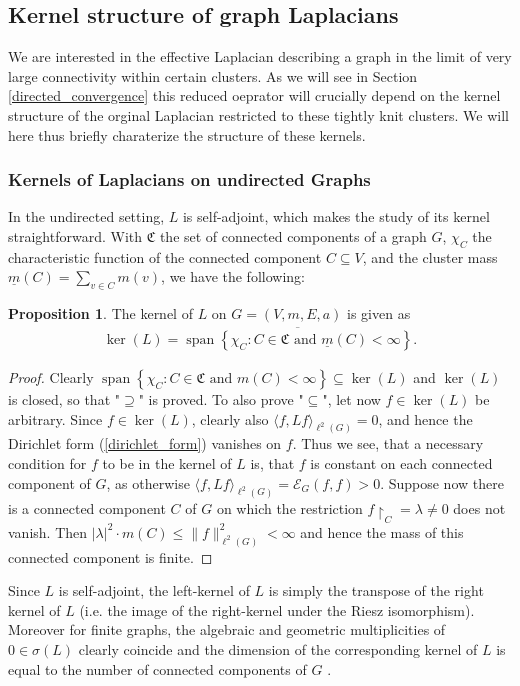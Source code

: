 \documentclass[reqno,12pt,letterpaper]{amsart}
\numberwithin{equation}{section}
\newcommand{\1}{\mathds{1}}
\theoremstyle{definition}
\newtheorem{prop}{Proposition}[section]
\begin{document}
\subsection{Kernel structure of graph Laplacians  }
\label{chap:kernels}
We are interested in the effective Laplacian describing a graph in the limit of very large connectivity within certain clusters. As we will see in Section \ref{directed_convergence} this reduced oeprator will crucially depend on the kernel structure of the orginal Laplacian restricted to these tightly knit clusters. We will here thus briefly charaterize  the structure of these kernels.

\subsubsection{Kernels of Laplacians on undirected Graphs}
In the undirected setting, $L$ is self-adjoint, which makes the study of its kernel straightforward. With $\mathfrak{C}$ the set of connected components of a graph $G$,  $\chi_C$ the characteristic function of the connected component $C \subseteq V$,  and the cluster mass $\underline{m}(C) = \sum_{v \in C} m(v)$, we have the following:
\begin{prop}
	The kernel of $L$ on $G = (V, m, E, a)$ is given as 
	\begin{align}
	\ker(L) = \overline{\operatorname{span} \left\{ \chi_C : C \in \mathfrak{C} \text{ and } \underline{m}(C) < \infty \right\}}.
	\end{align}
\end{prop}
\begin{proof}
Clearly $\operatorname{span} \left\{ \chi_C : C \in \mathfrak{C} \text{ and } m(C) < \infty \right\} \subseteq \ker(L)$ and $\ker(L)$ is closed, so that "$\supseteq
$"  is proved.
To also prove "$\subseteq$", let now $f \in \ker(L)$ be arbitrary.  Since $f \in \ker(L)$,  clearly also $\langle f, L f \rangle_{\ell^2(G)} = 0$, and hence the Dirichlet form (\ref{dirichlet_form}) vanishes on $f$. Thus we see, that a necessary condition for $f$ to be in the kernel of $L$ is, that $f$ is constant on each connected component of $G$, as otherwise $\langle f, L f \rangle_{\ell^2(G)} = \mathcal{E}_G(f,f) > 0$. Suppose now there is a connected component $C$ of $G$ on which the restriction $f{\restriction_C} = \lambda \neq 0$ does not vanish. Then $|\lambda|^2 \cdot m(C) \leq \|f\|^2_{\ell^2(G)} < \infty$ and hence the mass of this connected component is finite.
\end{proof}
Since $L$ is self-adjoint, the left-kernel of $L$ is simply the transpose of the right kernel of $L$ (i.e. the image 
of the right-kernel 
under the Riesz isomorphism).
Moreover for finite graphs, the algebraic and geometric multiplicities of  $0 \in \sigma(L)$ clearly coincide and the dimension of the corresponding kernel of $L$ is equal to the number of connected components of $G$  \cite{chung1997spectral}.
\medskip
\end{document}
